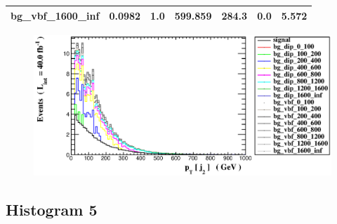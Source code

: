 \documentclass[a4paper, 10pt]{article}
\begin{document}
\begin{table}[H]
\begin{center}
\begin{tabular}{|m{23.0mm}|m{23.0mm}|m{18.0mm}|m{19.0mm}|m{19.0mm}|m{19.0mm}|m{19.0mm}|}
      \hline
      {\cellcolor{white}         bg\_vbf\_1600\_inf}& {\cellcolor{white}         0.0982}& {\cellcolor{white}         1.0}& {\cellcolor{white}         599.859}& {\cellcolor{white}         284.3}& {\cellcolor{orange}         0.0}& {\cellcolor{orange}         5.572}\\
\hline
    \end{tabular}
  \end{center}
\end{table}

\begin{figure}[H]
  \begin{center}
    \includegraphics[scale=0.45]{selection_3.eps}\\
\caption{   }
  \end{center}
\end{figure}
      \newpage
\subsection{ Histogram 5}
\end{document}
